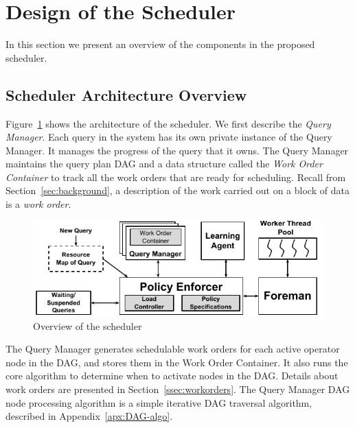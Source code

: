 \section{Design of the Scheduler}\label{sec:design}
In this section we present an overview of the components in the proposed \sys{} scheduler.

\subsection{Scheduler Architecture Overview}\label{ssec:scheduler-arch}
Figure~\ref{fig:scheduler-architecture} shows the architecture of the \sys{} scheduler.
We first describe the \textit{Query Manager}. 
Each query in the system has its own private instance of the Query Manager.
It manages the progress of the query that it owns.
The Query Manager maintains the query plan DAG and a data structure called
the \textit{Work Order Container} to track all the work orders that are ready for
scheduling. 
Recall from Section~\ref{sec:background}, a description of the work 
carried out on a block of data is a \textit{work order}. 

\begin{figure}
	\centering
	\includegraphics[width=\columnwidth]{figures/Scheduler-Architecture.pdf}
	\vspace*{-1.5em}
	\caption{Overview of the scheduler}
	\label{fig:scheduler-architecture}
	\vspace*{-1.5em}
\end{figure}

The Query Manager generates schedulable work orders for each active operator node
in the DAG, and stores them in the Work Order Container.
It also runs the core algorithm to determine when to activate nodes in the DAG. 
Details about work orders are presented in Section~\ref{ssec:workorders}.
The Query Manager DAG node processing algorithm is a simple iterative DAG traversal algorithm, described in Appendix~\ref{apx:DAG-algo}. 

